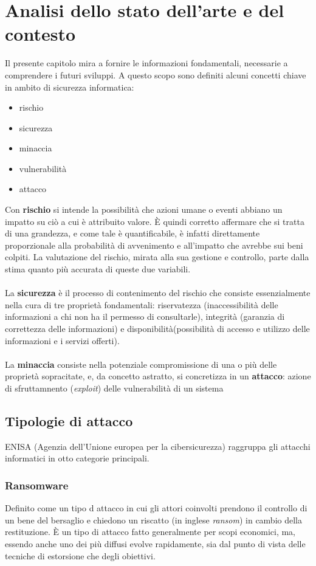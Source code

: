 \documentclass[12pt,a4paper,openright,twoside]{report}
\begin{document}
\chapter{Analisi dello stato dell'arte e del contesto}
Il presente capitolo mira a fornire le informazioni fondamentali, necessarie a comprendere i futuri sviluppi. A questo scopo sono definiti alcuni concetti chiave in ambito di sicurezza informatica:
\begin{itemize}
    \item rischio
    \item sicurezza
    \item minaccia
    \item vulnerabilit\`a
    \item attacco
\end{itemize}
Con \textbf{rischio} si intende la possibilit\`a che azioni umane o eventi  abbiano un impatto su ci\`o a cui \`e attribuito valore. \`E quindi corretto affermare che si tratta di una grandezza, e come tale \`e quantificabile, \`e infatti direttamente proporzionale alla probabilit\`a di avvenimento e all'impatto che avrebbe sui beni colpiti. La valutazione del rischio, mirata alla sua gestione e controllo, parte dalla stima quanto pi\`u accurata di queste due variabili.\\
\\
La \textbf{sicurezza} \`e il processo di contenimento del rischio che consiste essenzialmente nella cura di tre propriet\`a fondamentali: riservatezza (inaccessibilit\`a delle informazioni a chi non ha il permesso di consultarle), integrit\`a (garanzia di correttezza delle informazioni) e disponibilit\`a(possibilit\`a di accesso e utilizzo delle informazioni e i servizi offerti).\\
\\
La \textbf{minaccia} consiste nella potenziale compromissione di una o pi\`u delle propriet\`a sopracitate, e, da concetto astratto, si concretizza in un \textbf{attacco}: azione di sfruttamnento (\textit{exploit}) delle vulnerabilit\`a di un sistema\\

\section{Tipologie di attacco}
ENISA (Agenzia dell'Unione europea per la cibersicurezza) raggruppa gli attacchi informatici in otto categorie principali.\cite{enisa_threat_landscape}
\subsection{Ransomware}
Definito come un tipo d attacco in cui gli attori coinvolti prendono il controllo di un bene del bersaglio e chiedono un riscatto (in inglese \textit{ransom}) in cambio della restituzione. \`E un tipo di attacco fatto generalmente per scopi economici, ma, essendo anche uno dei pi\`u diffusi evolve rapidamente, sia dal punto di vista delle tecniche di estorsione che degli obiettivi.\\
\end{document}
